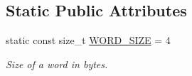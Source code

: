 \subsection*{Static Public Attributes}
\begin{DoxyCompactItemize}
\item 
\hypertarget{class_encrypt_key_a70d96a008864bba3178f3fe16aaa9cca}{
static const size\_\-t \hyperlink{class_encrypt_key_a70d96a008864bba3178f3fe16aaa9cca}{WORD\_\-SIZE} = 4}
\label{class_encrypt_key_a70d96a008864bba3178f3fe16aaa9cca}

\begin{DoxyCompactList}\small\item\em Size of a word in bytes. \item\end{DoxyCompactList}\end{DoxyCompactItemize}
